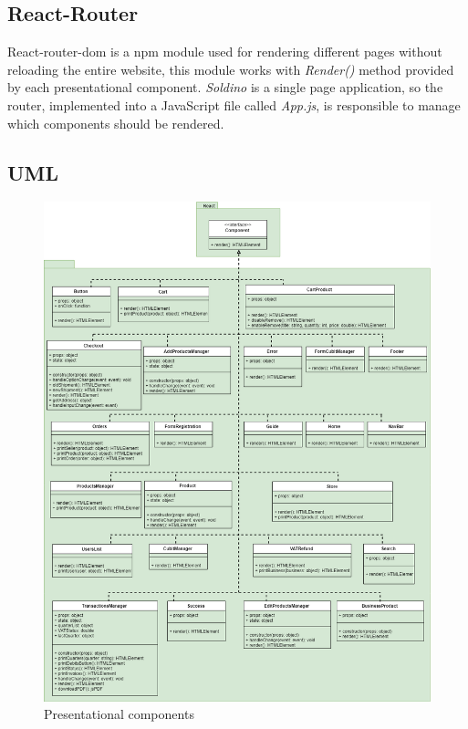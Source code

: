 \subsection{React-Router} 
React-router-dom is a npm module used for rendering different pages without reloading the entire website, this module works with \textit{Render()} method provided by each presentational component. \textit{Soldino} is a single page application, so the router, implemented into a JavaScript file called \textit{App.js}, is responsible to manage which components should be rendered.

\subsection{UML} 
\begin{figure}[H]
	\centering\includegraphics[scale = 0.38]{res/images/Presentational.png}
	\caption{Presentational components}
\end{figure}
